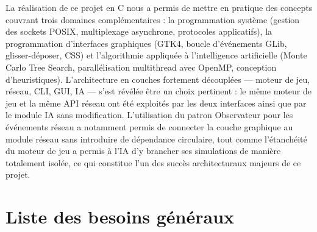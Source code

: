 \documentclass[a4paper]{article}
\begin{document}
La réalisation de ce projet en C nous a permis de mettre en pratique des concepts couvrant trois domaines complémentaires : la programmation système (gestion des sockets POSIX, multiplexage asynchrone, protocoles applicatifs), la programmation d'interfaces graphiques (GTK4, boucle d'événements GLib, glisser-déposer, CSS) et l'algorithmie appliquée à l'intelligence artificielle (Monte Carlo Tree Search, parallélisation multithread avec OpenMP, conception d'heuristiques). L'architecture en couches fortement découplées --- moteur de jeu, réseau, CLI, GUI, IA --- s'est révélée être un choix pertinent : le même moteur de jeu et la même API réseau ont été exploités par les deux interfaces ainsi que par le module IA sans modification. L'utilisation du patron Observateur pour les événements réseau a notamment permis de connecter la couche graphique au module réseau sans introduire de dépendance circulaire, tout comme l'étanchéité du moteur de jeu a permis à l'IA d'y brancher ses simulations de manière totalement isolée, ce qui constitue l'un des succès architecturaux majeurs de ce projet.



\nocite{*}
 


\newpage




\appendix

\tableofcontents
 
\section{Liste des besoins généraux}
\label{ann:besoins-generaux}
 
\renewcommand{\arraystretch}{1.4}
 
 
\end{document}
